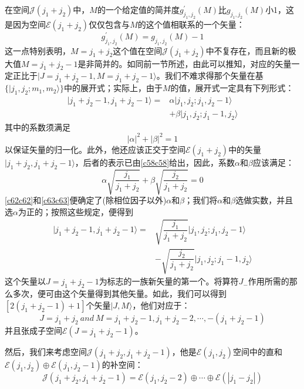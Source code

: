 \documentclass[]{article}
\begin{document}
在空间$\mathscr{J}(j_1+j_2)$中，$M$的一个给定值的简并度$g^\prime_{j_1,j_2}(M)$比$g_{j_1,j_2}(M)$小1，这是因为空间$\mathscr{E}(j_1+j_2)$仅仅包含与$M$的这个值相联系的一个矢量：
\begin{equation}
	g^\prime_{j_1,j_2}(M)=g_{j_1,j_2}(M)-1
\end{equation}
这一点特别表明，$M=j_1+j_2$这个值在空间$\mathscr{J}(j_1+j_2)$中不复存在，而且新的极大值$M=j_1+j_2-1$是非简并的。如同前一节所述，由此可以推知，对应的矢量一定正比于$|J=j_1+j_2-1,M=j_1+j_2-1\rangle$。我们不难求得那个矢量在基$\{|j_1,j_2;m_1,m_2\rangle\}$中的展开式；实际上，由于$M$的值，展开式一定具有下列形式：
\begin{align}
	|j_1+j_2-1,j_1+j_2-1\rangle=&\alpha|j_1,j_2;j_1,j_2-1\rangle\nonumber\\
	&+\beta|j_1,j_2;j_1-1,j_2\rangle
\end{align}
其中的系数须满足
\begin{equation}
	|\alpha|^2+|\beta|^2=1
	\label{c62c62}
\end{equation}
以保证矢量的归一化。此外，他还应该正交于空间$\mathscr{E}(j_1+j_2)$中的矢量$|j_1+j_2,j_1+j_2-1\rangle$，后者的表示已由\eqref{c58c58}给出，因此，系数$\alpha$和$\beta$应该满足：
\begin{equation}
	\alpha\sqrt{\dfrac{j_1}{j_1+j_2}}+\beta\sqrt{\dfrac{j_2}{j_1+j_2}}=0
	\label{c63c63}
\end{equation}
\eqref{c62c62}和\eqref{c63c63}便确定了(除相位因子以外)$\alpha$和$\beta$；我们将$\alpha$和$\beta$选做实数，并且选$\alpha$为正的；按照这些规定，便得到
\begin{align}
	|j_1+j_2-1,j_1+j_2-1\rangle=&\sqrt{\dfrac{j_1}{j_1+j_2}}|j_1,j_2;j_1,j_2-1\rangle\nonumber\\
	&-\sqrt{\dfrac{j_2}{j_1+j_2}}|j_1,j_2;j_1-1,j_2\rangle
\end{align}
这个矢量以$J=j_1+j_2-1$为标志的一族新矢量的第一个。将算符$J_-$作用所需的那么多次，便可由这个矢量得到其他矢量。如此，我们可以得到$[2(j_1+j_2-1)+1]$个矢量$|J,M\rangle$，他们对应于：
\begin{equation}
	J=j_1+j_2\ and\ M=j_1+j_2-1,j_1+j_2-2,\cdots,-(j_1+j_2-1)
\end{equation}
并且张成子空间$\mathscr{E}(J=j_1+j_2-1)$。\par 
然后，我们来考虑空间$\mathscr{J}(j_1+j_2,j_1+j_2-1)$，他是$\mathscr{E}(j_1,j_2)$空间中的直和$\mathscr{E}(j_1,j_2)\oplus\mathscr{E}(j_1,j_2-1)$的补空间：
\begin{equation}
	\mathscr{J}(j_1+j_2,j_1+j_2-1)=\mathscr{E}(j_1,j_2-2)\oplus\cdots\oplus\mathscr{E}(|j_1-j_2|)
\end{equation}
\end{document}
